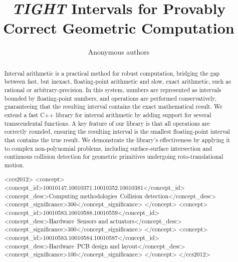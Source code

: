 \documentclass{egpubl}
\title[Short title here]%
      {\emph{TIGHT} Intervals for Provably Correct Geometric Computation}
\author[Anonymous]
{\parbox{\textwidth}{\centering Anonymous authors}}
\begin{document}

\maketitle
\begin{abstract}
Interval arithmetic is a practical method for robust computation, bridging the gap between fast, but inexact, floating-point arithmetic and slow, exact arithmetic, such as rational or arbitrary-precision. In this system, numbers are represented as intervals bounded by floating-point numbers, and operations are performed conservatively, guaranteeing that the resulting interval contains the exact mathematical result.
%
We extend a fast C++ library for interval arithmetic by adding support for several transcendental functions. A key feature of our library is that all operations are correctly rounded, ensuring the resulting interval is the smallest floating-point interval that contains the true result.
We demonstrate the library’s effectiveness by applying it to complex non-polynomial problems, including surface-surface intersection and continuous collision detection for geometric primitives undergoing roto-translational motion.

\begin{CCSXML}
<ccs2012>
<concept>
<concept_id>10010147.10010371.10010352.10010381</concept_id>
<concept_desc>Computing methodologies~Collision detection</concept_desc>
<concept_significance>300</concept_significance>
</concept>
<concept>
<concept_id>10010583.10010588.10010559</concept_id>
<concept_desc>Hardware~Sensors and actuators</concept_desc>
<concept_significance>300</concept_significance>
</concept>
<concept>
<concept_id>10010583.10010584.10010587</concept_id>
<concept_desc>Hardware~PCB design and layout</concept_desc>
<concept_significance>100</concept_significance>
</concept>
</ccs2012>
\end{CCSXML}


\end{abstract}
\end{document}
